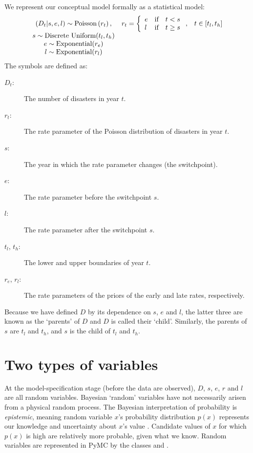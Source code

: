 We represent our conceptual model formally as a statistical model:
\begin{equation}
    \begin{array}{ccc}
        (D_t | s, e, l) \sim \textup{Poisson}\left(r_t\right), & r_t=\left\{\begin{array}{lll}
            e &\textup{if}& t< s\\ l &\textup{if}& t\ge s
            \end{array}\right.,&t\in[t_l,t_h]\\
        s\sim \textup{Discrete Uniform}(t_l, t_h)\\
        e\sim \textup{Exponential}(r_e)\\
        l\sim \textup{Exponential}(r_l)
    \end{array}
    \label{disastermodel}
\end{equation}
The symbols are defined as:
\begin{description}
    \item[$D_t$:] The number of disasters in year $t$.
    \item[$r_t$:] The rate parameter of the Poisson distribution of disasters in year $t$.
    \item[$s$:] The year in which the rate parameter changes (the switchpoint).
    \item[$e$:] The rate parameter before the switchpoint $s$.
    \item[$l$:] The rate parameter after the switchpoint $s$.
    \item[$t_l$, $t_h$:] The lower and upper boundaries of year $t$.
    \item[$r_e$, $r_l$:] The rate parameters of the priors of the early and late rates, respectively.
\end{description}
Because we have defined $D$ by its dependence on $s$, $e$ and $l$, the latter three are known as the `parents' of $D$ and $D$ is called their `child'. Similarly, the parents of $s$ are $t_l$ and $t_h$, and $s$ is the child of $t_l$ and $t_h$.


\section{Two types of variables}

At the model-specification stage (before the data are observed), $D$, $s$, $e$,
$r$ and $l$ are all random variables. Bayesian `random' variables have not
necessarily arisen from a physical random process. The Bayesian interpretation
of probability is \emph{epistemic}, meaning random variable $x$'s probability
distribution $p(x)$ represents our knowledge and uncertainty about $x$'s value
\citep{jaynes}. Candidate values of $x$ for which $p(x)$ is high are
relatively more probable, given what we know. Random variables are represented
in PyMC by the classes  and .

